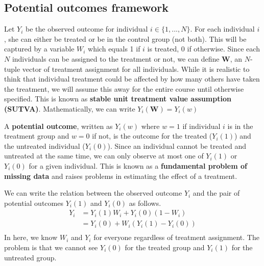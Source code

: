 \documentclass[12pt]{article}
\theoremstyle{definition}
\theoremstyle{property}
\theoremstyle{assumption}
\theoremstyle{example}
\theoremstyle{comment}
\begin{document}
\subsection{Potential outcomes framework}
Let $Y_i$ be the observed outcome for individual $i\in\{1,...,N\}$. For each individual $i$, she can either be treated or be in the control group (not both). This will be captured by a variable $W_i$ which equals 1 if $i$ is treated, 0 if otherwise. Since each $N$ individuals can be assigned to the treatment or not, we can define $\mathbf{W}$, an $N$-tuple vector of treatment assignment for all individuals. While it is realistic to think that individual treatment could be affected by how many others have taken the treatment, we will assume this away for the entire course until otherwise specified. This is known as \textbf{stable unit treatment value assumption (SUTVA)}. Mathematically, we can write $Y_i(\mathbf{W})=Y_i(w)$\par
A \textbf{potential outcome}, written as $Y_i(w)$ where $w=1$  if individual $i$ is in the treatment group and $w=0$ if not, is the outcome for the treated ($Y_i(1)$) and the untreated individual ($Y_i(0)$). Since an individual cannot be treated and untreated at the same time, we can only observe at most one of $Y_i(1)$ or $Y_i(0)$ for a given individual. This is known as a \textbf{fundamental problem of missing data} and raises problems in estimating the effect of a treatment. 
\par
We can write the relation between the observed outcome $Y_i$ and the pair of potential outcomes $Y_i(1)$ and $Y_i(0)$ as follows. 
\[
\begin{aligned}
Y_ i &= Y_i(1)W_i + Y_i(0)(1-W_i)\\
&=Y_i(0)+W_i(Y_i(1)-Y_i(0))\\
\end{aligned}
\]
In here, we know $W_i$ and $Y_i$ for everyone regardless of treatment assignment. The problem is that we cannot see $Y_i(0)$ for the treated group and $Y_i(1)$ for the untreated group. 
\end{document}

